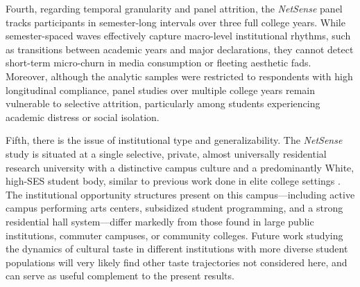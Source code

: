 \documentclass[12pt]{article}
\begin{document}
Fourth, regarding temporal granularity and panel attrition, the \textit{NetSense} panel tracks participants in semester-long intervals over three full college years. While semester-spaced waves effectively capture macro-level institutional rhythms, such as transitions between academic years and major declarations, they cannot detect short-term micro-churn in media consumption or fleeting aesthetic fads. Moreover, although the analytic samples were restricted to respondents with high longitudinal compliance, panel studies over multiple college years remain vulnerable to selective attrition, particularly among students experiencing academic distress or social isolation. 

Fifth, there is the issue of institutional type and generalizability. The \textit{NetSense} study is situated at a single selective, private, almost universally residential research university with a distinctive campus culture and a predominantly White, high-SES student body, similar to previous work done in elite college settings \citep{lewis2008tastes-cf7, lewis2018conversion}. The institutional opportunity structures present on this campus---including active campus performing arts centers, subsidized student programming, and a strong residential hall system---differ markedly from those found in large public institutions, commuter campuses, or community colleges. Future work studying the dynamics of cultural taste in different institutions with more diverse student populations will very likely find other taste trajectories not considered here, and can serve as useful complement to the present results. 


\end{document}
